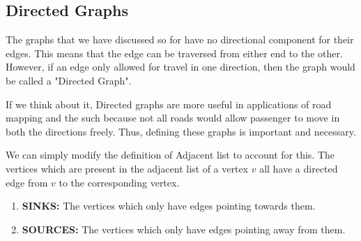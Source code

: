 \documentclass{article}
\theoremstyle{definition}
\theoremstyle{example}
\begin{document}
\subsection{\Large Directed Graphs}
\hspace{4mm} The graphs that we have discussed so for have no directional component for their edges. This means that the edge can be traversed from either end to the other. However, if an edge only allowed for travel in one direction, then the graph would be called a "Directed Graph".\par
\vspace{4mm}
If we think about it, Directed graphs are more useful in applications of road mapping and the such because not all roads would allow passenger to move in both the directions freely. Thus, defining these graphs is important and necessary.\par
\vspace{4mm}
We can simply modify the definition of Adjacent list to account for this. The vertices which are present in the adjacent list of a vertex $v$ all have a directed edge from $v$ to the corresponding vertex.\par

\begin{enumerate}
    \item \textbf{SINKS: }The vertices which only have edges pointing towards them.
    \item \textbf{SOURCES: }The vertices which only have edges pointing away from them.
\end{enumerate}
\end{document}
